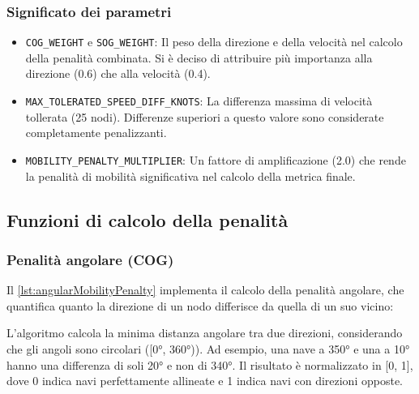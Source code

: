 

\subsubsection{Significato dei parametri}
\label{significato_parametri}

\begin{itemize}
    \item \texttt{COG\_WEIGHT} e \texttt{SOG\_WEIGHT}: Il peso della direzione e della velocità nel calcolo della penalità combinata. Si è deciso di attribuire più importanza alla direzione (0.6) che alla velocità (0.4).
    \item \texttt{MAX\_TOLERATED\_SPEED\_DIFF\_KNOTS}: La differenza massima di velocità tollerata (25 nodi). Differenze superiori a questo valore sono considerate completamente penalizzanti.
    \item \texttt{MOBILITY\_PENALTY\_MULTIPLIER}: Un fattore di amplificazione (2.0) che rende la penalità di mobilità significativa nel calcolo della metrica finale.
\end{itemize}

\subsection{Funzioni di calcolo della penalità}
\label{sec:funzioni_calcolo_penalita}

\subsubsection{Penalità angolare (COG)}
\label{sec:penalita_angolare}

Il \cref{lst:angularMobilityPenalty} implementa il calcolo della penalità angolare, che quantifica quanto la direzione di un nodo differisce da quella di un suo vicino:



L'algoritmo calcola la minima distanza angolare tra due direzioni, considerando che gli angoli sono circolari ([0°, 360°)). Ad esempio, una nave a 350° e una a 10° hanno una differenza di soli 20° e non di 340°. Il risultato è normalizzato in [0, 1], dove 0 indica navi perfettamente allineate e 1 indica navi con direzioni opposte.

